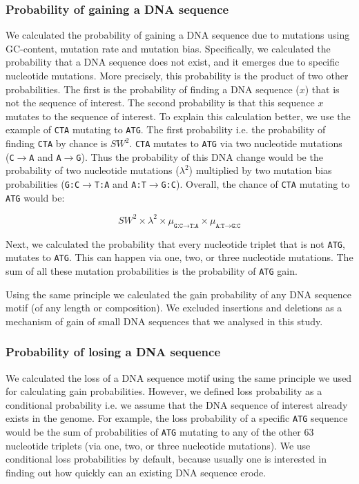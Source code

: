 \documentclass[12pt,a4paper]{article}
\begin{document}
\subsubsection{Probability of gaining a DNA sequence}
\label{methgain}

We calculated the probability of gaining a DNA sequence due to mutations using GC-content, mutation rate and mutation bias. Specifically, we calculated the probability that a DNA sequence does not exist, and it emerges due to specific nucleotide mutations. More precisely, this probability is the product of two other probabilities. The first is the probability of finding a DNA sequence ($x$) that is not the sequence of interest. The second probability is that this sequence $x$ mutates to the sequence of interest. To explain this calculation better, we use the example of \texttt{CTA} mutating to \texttt{ATG}. The first probability i.e. the probability of finding \texttt{CTA} by chance is $SW^2$. \texttt{CTA} mutates to \texttt{ATG} via two nucleotide mutations (\texttt{C}$\to$\texttt{A} and \texttt{A}$\to$\texttt{G}). Thus the probability of this DNA change would be the probability of two nucleotide mutations ($\lambda^2$) multiplied by two mutation bias probabilities (\texttt{G:C}$\to$\texttt{T:A} and \texttt{A:T}$\to$\texttt{G:C}). Overall, the chance of \texttt{CTA} mutating to \texttt{ATG} would be:

$$SW^2 \times \lambda^2 \times \mu_{\texttt{G:C}\to\texttt{T:A}} \times \mu_{\texttt{A:T}\to\texttt{G:C}}$$

Next, we calculated the probability that every nucleotide triplet that is not \texttt{ATG}, mutates to \texttt{ATG}. This can happen via one, two, or three nucleotide mutations. The sum of all these mutation probabilities is the probability of \texttt{ATG} gain.

Using the same principle we calculated the gain probability of any DNA sequence motif (of any length or composition). We excluded insertions and deletions as a mechanism of gain of small DNA sequences that we analysed in this study. 

\subsubsection{Probability of losing a DNA sequence}

We calculated the loss of a DNA sequence motif using the same principle we used for calculating gain probabilities. However, we defined loss probability as a conditional probability i.e. we assume that the DNA sequence of interest already exists in the genome. For example, the loss probability of a specific \texttt{ATG} sequence would be the sum of probabilities of \texttt{ATG} mutating to any of the other 63 nucleotide triplets (via one, two, or three nucleotide mutations). We use conditional loss probabilities by default, because usually one is interested in finding out how quickly can an existing DNA sequence erode.
\end{document}
